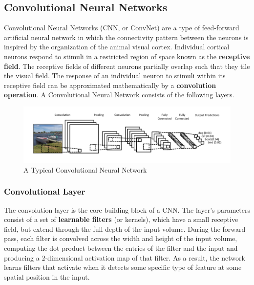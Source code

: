 \documentclass[11pt]{article}
\begin{document}
			\subsection{Convolutional Neural Networks}
			Convolutional Neural Networks (CNN, or ConvNet) are a type of feed-forward artificial neural network in which the connectivity pattern between the neurons is inspired by the organization of the animal visual cortex. Individual cortical neurons respond to stimuli in a restricted region of space known as the \textbf{receptive field}. The receptive fields of different neurons partially overlap such that they tile the visual field. The response of an individual neuron to stimuli within its receptive field can be approximated mathematically by a \textbf{convolution operation}. A Convolutional Neural Network consists of the following layers.\cite{showandtell}
								
				\begin{figure}[ht!]
					\includegraphics[width=1.0\textwidth]{conv.png}
					\caption{A Typical Convolutional Neural Network\label{fig4}}
				\end{figure}
				\subsubsection{Convolutional Layer}
					The convolution layer is the core building block of a CNN. The layer's parameters consist of a set of \textbf{learnable filters} (or kernels), which have a small receptive field, but extend through the full depth of the input volume. During the forward pass, each filter is convolved across the width and height of the input volume, computing the dot product between the entries of the filter and the input and producing a $2$-dimensional activation map of that filter.\cite{cs231n} As a result, the network learns filters that activate when it detects some specific type of feature at some spatial position in the input.
\end{document}
